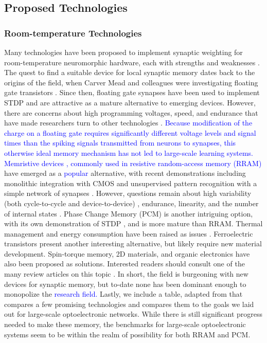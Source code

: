 \documentclass[twocolumn]{article}
\begin{document}
\subsection{Proposed Technologies}\label{Proposed}
\subsubsection{Room-temperature Technologies}

Many technologies have been proposed to implement synaptic weighting for room-temperature neuromorphic hardware, each with strengths and weaknesses \cite{upadhyay2019emerging}. The quest to find a suitable device for local synaptic memory dates back to the origins of the field, when Carver Mead and colleagues were investigating floating gate transistors \cite{diorio1998floating}. Since then, floating gate synapses have been used to implement STDP \cite{ramakrishnan2011floating} and are attractive as a mature alternative to emerging devices. However, there are concerns about high programming voltages, speed, and endurance that have made researchers turn to other technologies \cite{zahoor2020resistive}. \textcolor{blue}{Because modification of the charge on a floating gate requires significantly different voltage levels and signal times than the spiking signals transmitted from neurons to synapses, this otherwise ideal memory mechanism has not led to large-scale learning systems. Memristive devices \cite{stsn2008,yast2012,ab2018}, commonly used in resistive random-access memory (RRAM)} have emerged as a \textcolor{blue}{popular} alternative, with recent demonstrations including monolithic integration with CMOS \cite{yin2019monolithically} and unsupervised pattern recognition with a simple network of synapses \cite{ielmini2018brain}. However, questions remain about high variability (both cycle-to-cycle and device-to-device) \cite{dalgaty2019hybrid}, endurance, linearity, and the number of internal states \cite{zahoor2020resistive}. Phase Change Memory (PCM) is another intriguing option, with its own demonstration of STDP \cite{ambrogio2016unsupervised}, and is more mature than RRAM. Thermal management and energy consumption have been raised as issues \cite{upadhyay2019emerging, zahoor2020resistive}. Ferroelectric transistors present another interesting alternative, but likely require new material development. Spin-torque memory, 2D materials, and organic electronics have also been proposed as solutions. Interested readers should consult one of the many review articles on this topic \cite{kim2018recent, upadhyay2019emerging, zhang2020brain}. In short, the field is burgeoning with new devices for synaptic memory, but to-date none has been dominant enough to monopolize the \textcolor{blue}{research field.} Lastly, we include a table, adapted from \cite{zahoor2020resistive} that compares a few promising technologies and compares them to the goals we laid out for large-scale optoelectronic networks. While there is still significant progress needed to make these memory, the benchmarks for large-scale optoelectronic systems seem to be within the realm of possibility for both RRAM and PCM.
\end{document}
